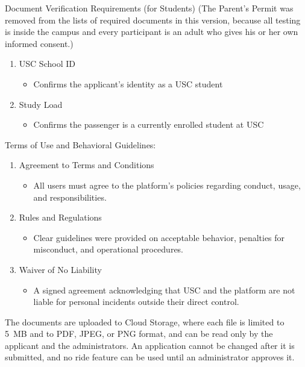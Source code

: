 \vspace{1em}
\indent Document Verification Requirements (for Students)
(The Parent's Permit was removed from the lists of required documents in this version, because all testing is inside the campus and every participant is an adult who gives his or her own informed consent.)
\begin{enumerate}
    \item USC School ID
    \begin{itemize}
        \item Confirms the applicant's identity as a USC student
    \end{itemize}

    \item Study Load
    \begin{itemize}
        \item Confirms the passenger is a currently enrolled student at USC
    \end{itemize}
        
\end{enumerate}

\vspace{1em}
\indent Terms of Use and Behavioral Guidelines:
\begin{enumerate}
    \item Agreement to Terms and Conditions 
    \begin{itemize}
        \item All users must agree to the platform’s policies regarding conduct, usage, and responsibilities.
    \end{itemize}
        
    \item Rules and Regulations 
    \begin{itemize}
        \item Clear guidelines were provided on acceptable behavior, penalties for misconduct, and operational procedures.
    \end{itemize}

    \item Waiver of No Liability  
    \begin{itemize}
        \item A signed agreement acknowledging that USC and the platform are not liable for personal incidents outside their direct control.
    \end{itemize}
\end{enumerate}

The documents are uploaded to Cloud Storage, where each file is limited to 5~MB and to PDF, JPEG, or PNG format, and can be read only by the applicant and the administrators. An application cannot be changed after it is submitted, and no ride feature can be used until an administrator approves it.

